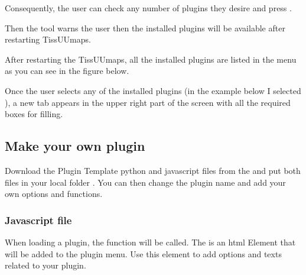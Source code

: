 \documentclass[letterpaper,10pt,english,openany,oneside]{sphinxmanual}
\begin{document}
\sphinxAtStartPar
{}

\sphinxAtStartPar
Consequently, the user can check any number of plugins they desire and press .

\sphinxAtStartPar
{}

\sphinxAtStartPar
Then the tool warns the user then the installed plugins will be available after restarting TissUUmaps.

\sphinxAtStartPar
{}

\sphinxAtStartPar
After restarting the TissUUmaps, all the installed plugins are listed in the menu  as you can see in the figure below.

\sphinxAtStartPar
{}

\sphinxAtStartPar
Once the user selects any of the installed plugins (in the example below I selected ), a new tab  appears in the upper right part of the screen with all the required boxes for filling.

\sphinxAtStartPar
{}


\subsection{Make your own plugin}
\label{\detokenize{docs/starting/plugins:make-your-own-plugin}}
\sphinxAtStartPar
Download the Plugin Template python and javascript files from the  and put both files in your local folder . You can then change the plugin name and add your own options and functions.


\subsubsection{Javascript file}
\label{\detokenize{docs/starting/plugins:javascript-file}}
\sphinxAtStartPar
When loading a plugin, the function  will be called. The  is an html Element that will be added to the plugin menu. Use this element to add options and texts related to your plugin.

\sphinxAtStartPar
{}
\end{document}
